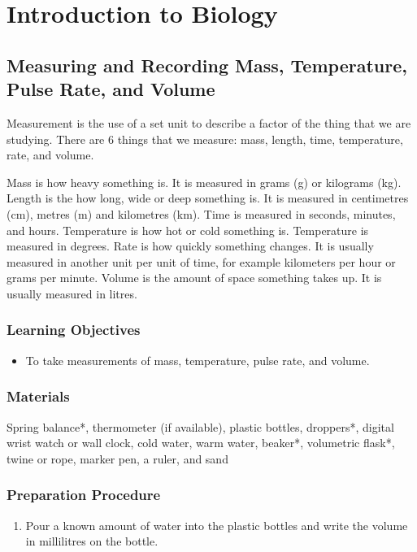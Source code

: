 \section{Introduction to Biology}

\subsection{Measuring and Recording Mass, Temperature, Pulse Rate, and Volume}
Measurement is the use of a set unit to describe a factor of the thing that we are studying. There are 6 things that we measure: mass, length, time, temperature, rate, and volume.

Mass is how heavy something is. It is measured in grams (g) or kilograms (kg). Length is the how long, wide or deep something is. It is measured in centimetres (cm), metres (m) and kilometres (km). Time is measured in seconds, minutes, and hours. Temperature is how hot or cold something is. Temperature is measured in degrees. Rate is how quickly something changes. It is usually measured in another unit per unit of time, for example kilometers per hour or grams per minute. Volume is the amount of space something takes up. It is usually measured in litres.

\subsubsection*{Learning Objectives}
\begin{itemize}
\item{To take measurements of mass, temperature, pulse rate, and volume.}
\end{itemize}

\subsubsection*{Materials}
Spring balance*, thermometer (if available), plastic bottles, droppers*, digital wrist watch or wall clock, cold water, warm water, beaker*, volumetric flask*, twine or rope, marker pen, a ruler, and sand

\subsubsection*{Preparation Procedure}
\begin{enumerate}
\item{Pour a known amount of water into the plastic bottles and write the volume in millilitres on the bottle.}
\end{enumerate}

